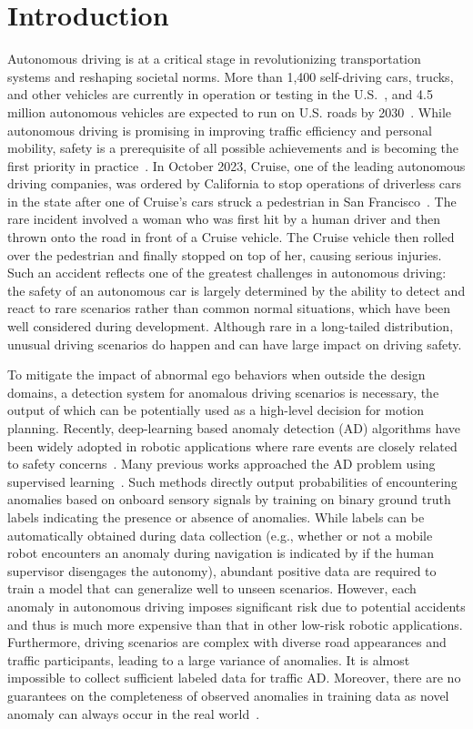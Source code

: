 \section{Introduction}
Autonomous driving is at a critical stage in revolutionizing transportation systems and reshaping societal norms. More than 1,400 self-driving cars, trucks, and other vehicles are currently in operation or testing in the U.S.~\citep{etherington2019over}, and 4.5 million autonomous vehicles are expected to run on U.S. roads by 2030~\citep{meyer2023safety}. While autonomous driving is promising in improving traffic efficiency and personal mobility, safety is a prerequisite of all possible achievements and is becoming the first priority in practice~\citep{du2020online}. In October 2023, Cruise, one of the leading autonomous driving companies, was ordered by California to stop operations of driverless cars in the state after one of Cruise's cars struck a pedestrian in San Francisco~\citep{dara2023california}. The rare incident involved a woman who was first hit by a human driver and then thrown onto the road in front of a Cruise vehicle. The Cruise vehicle then rolled over the pedestrian and finally stopped on top of her, causing serious injuries. Such an accident reflects one of the greatest challenges in autonomous driving: the safety of an autonomous car is largely determined by the ability to detect and react to rare scenarios rather than common normal situations, which have been well considered during development. Although rare in a long-tailed distribution, unusual driving scenarios do happen and can have large impact on driving safety.

To mitigate the impact of abnormal ego behaviors when outside the design domains, a detection system for anomalous driving scenarios is necessary, the output of which can be potentially used as a high-level decision for motion planning. Recently, deep-learning based anomaly detection (AD) algorithms have been widely adopted in robotic applications where rare events are closely related to safety concerns~\citep{chalapathy2019deep}. Many previous works approached the AD problem using supervised learning~\citep{kahn2021land,ji2020multi,ji2022proactive,schreiber2023attentional}. Such methods directly output probabilities of encountering anomalies based on onboard sensory signals by training on binary ground truth labels indicating the presence or absence of anomalies. While labels can be automatically obtained during data collection (e.g., whether or not a mobile robot encounters an anomaly during navigation is indicated by if the human supervisor disengages the autonomy), abundant positive data are required to train a model that can generalize well to unseen scenarios. However, each anomaly in autonomous driving imposes significant risk due to potential accidents and thus is much more expensive than that in other low-risk robotic applications. Furthermore, driving scenarios are complex with diverse road appearances and traffic participants, leading to a large variance of anomalies. It is almost impossible to collect sufficient labeled data for traffic AD. Moreover, there are no guarantees on the completeness of observed anomalies in training data as novel anomaly can always occur in the real world~\citep{liu2018future}.

